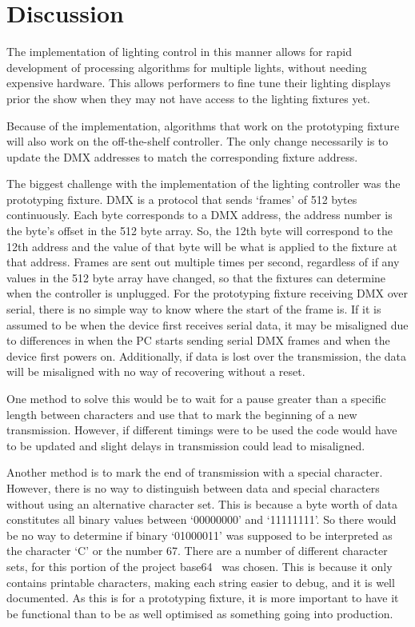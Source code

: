 \section{Discussion}
The implementation of lighting control in this manner allows for rapid development of processing algorithms for multiple lights,
without needing expensive hardware.
This allows performers to fine tune their lighting displays prior the show when they may not have access to the lighting fixtures yet.

Because of the implementation, algorithms that work on the prototyping fixture will also work on the off-the-shelf controller.
The only change necessarily is to update the DMX addresses to match the corresponding fixture address.

The biggest challenge with the implementation of the lighting controller was the prototyping fixture.
DMX is a protocol that sends `frames' of 512 bytes continuously.
Each byte corresponds to a DMX address, the address number is the byte's offset in the 512 byte array.
So, the 12th byte will correspond to the 12th address and the value of that byte will be what is applied to the fixture at that address.
Frames are sent out multiple times per second, regardless of if any values in the 512 byte array have changed,
so that the fixtures can determine when the controller is unplugged.
For the prototyping fixture receiving DMX over serial, there is no simple way to know where the start of the frame is.
If it is assumed to be when the device first receives serial data,
it may be misaligned due to differences in when the PC starts sending serial DMX frames and when the device first powers on.
Additionally, if data is lost over the transmission, the data will be misaligned with no way of recovering without a reset.

One method to solve this would be to wait for a pause greater than a specific length between characters
and use that to mark the beginning of a new transmission.
However, if different timings were to be used the code would have to be updated and slight delays in transmission could lead to misaligned.

Another method is to mark the end of transmission with a special character.
However, there is no way to distinguish between data and special characters without using an alternative character set.
This is because a byte worth of data constitutes all binary values between `00000000' and `11111111'.
So there would be no way to determine if binary `01000011' was supposed to be interpreted as the character `C' or the number 67.
There are a number of different character sets, for this portion of the project base64~\cite{Sumartono:2016} was chosen.
This is because it only contains printable characters, making each string easier to debug, and it is well documented.
As this is for a prototyping fixture, it is more important to have it be functional than to be as well optimised as something going into production.

